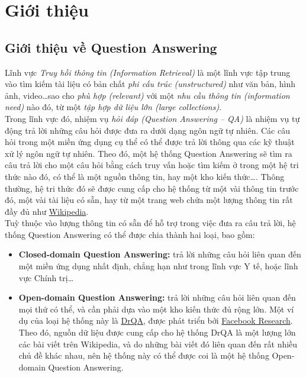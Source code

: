 \section{Giới thiệu}

\subsection{Giới thiệu về Question Answering}
Lĩnh vực \emph{Truy hồi thông tin (Information Retrieval)} là một lĩnh vực tập trung vào tìm kiếm tài liệu có bản chất \emph{phi cấu trúc (unstructured)} như văn bản, hình ảnh, video\dots sao cho \emph{phù hợp (relevant)} với một \emph{nhu cầu thông tin (information need)} nào đó, từ một \emph{tập hợp dữ liệu lớn (large collections)}.\\

Trong lĩnh vực đó, nhiệm vụ \emph{hỏi đáp (Question Answering – QA)} là nhiệm vụ tự động trả lời những câu hỏi được đưa ra dưới dạng ngôn ngữ tự nhiên. Các câu hỏi trong một miền ứng dụng cụ thể có thể được trả lời thông qua các kỹ thuật xử lý ngôn ngữ tự nhiên. Theo đó, một hệ thống Question Answering sẽ tìm ra câu trả lời cho một câu hỏi bằng cách truy vấn hoặc tìm kiếm ở trong một hệ tri thức nào đó, có thể là một nguồn thông tin, hay một kho kiến thức\dots. Thông thường, hệ tri thức đó sẽ được cung cấp cho hệ thống từ một vài thông tin trước đó, một vài tài liệu có sẵn, hay từ một trang web chứa một lượng thông tin rất đầy đủ như \href{https://www.wikipedia.org}{Wikipedia}.\\

Tuỳ thuộc vào lượng thông tin có sẵn để hỗ trợ trong việc đưa ra câu trả lời, hệ thống Question Answering có thể được chia thành hai loại, bao gồm:
\begin{itemize}
    \item \textbf{Closed-domain Question Answering:} trả lời những câu hỏi liên quan đến một miền ứng dụng nhất định, chẳng hạn như trong lĩnh vực Y tế, hoặc lĩnh vực Chính trị\dots
    \item \textbf{Open-domain Question Answering:} trả lời những câu hỏi liên quan đến mọi thứ có thể, và cần phải dựa vào một kho kiến thức đủ rộng lớn. Một ví dụ của loại hệ thống này là \href{https://arxiv.org/abs/1704.00051}{DrQA}, được phát triển bởi \href{https://research.fb.com}{Facebook Research}. Theo đó, nguồn dữ liệu được cung cấp cho hệ thống DrQA là một lượng lớn các bài viết trên Wikipedia, và do những bài viết đó liên quan đến rất nhiều chủ đề khác nhau, nên hệ thống này có thể được coi là một hệ thống Open-domain Question Answering.
\end{itemize}

